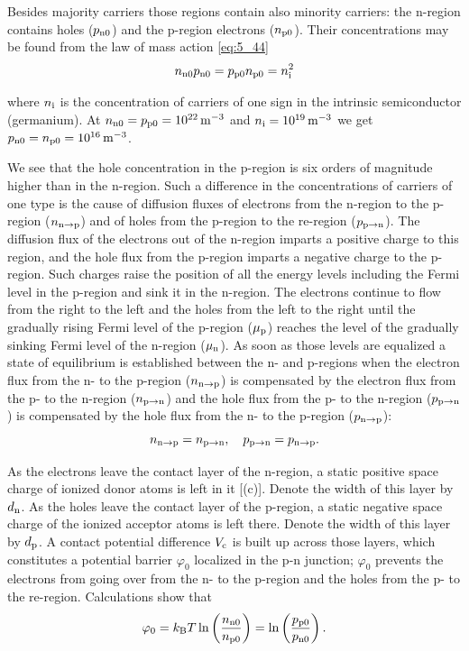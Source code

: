 Besides majority carriers those regions contain also minority carriers: the n-region contains holes ($p_{\text{n$0$}}$) and the p-region electrons ($n_{\text{p$0$}}$). Their concentrations may be found from the law of mass action \eqref{eq:5_44}
\begin{equation*}
	n_{\text{n$0$}} p_{\text{n$0$}} = p_{\text{p$0$}} n_{\text{p$0$}} = n_{\text{i}}^2
\end{equation*}

\noindent
where $n_{\text{i}}$ is the concentration of carriers of one sign in the intrinsic semiconductor (germanium). At $n_{\text{n$0$}}=p_{\text{p$0$}}=\SI{e22}{\per\metre\cubed}$ and $n_{\text{i}}=\SI{e19}{\per\metre\cubed}$ we get $p_{\text{n$0$}}=n_{\text{p$0$}}=\SI{e16}{\per\metre\cubed}$.

We see that the hole concentration in the p-region is six orders of magnitude higher than in the n-region. Such a difference in the concentrations of carriers of one type is the cause of diffusion fluxes of electrons from the n-region to the p-region ($n_{\text{n$\to$p}}$) and of holes from the p-region to the re-region ($p_{\text{p$\to$n}}$). The diffusion flux of the electrons out of the n-region imparts a positive charge to this region, and the hole flux from the p-region imparts a negative charge to the p-region. Such charges raise the position of all the energy levels including the Fermi level in the p-region and sink it in the n-region. The electrons continue to flow from the right to the left and the holes from the left to the right until the gradually rising Fermi level of the p-region ($\mu_{\text{p}}$) reaches the level of the gradually sinking Fermi level of the n-region ($\mu_{\text{n}}$).
As soon as those levels are equalized a state of equilibrium is established between the n- and p-regions when the electron flux from the n- to the p-region ($n_{\text{n$\to$p}}$) is compensated by the electron flux from the p- to the n-region ($n_{\text{p$\to$n}}$) and the hole flux from the p- to the n-region ($p_{\text{p$\to$n}}$) is compensated by the hole flux from the n- to the p-region ($p_{\text{n$\to$p}}$):
\begin{equation}\label{eq:8_17}
	n_{\text{n$\to$p}} = n_{\text{p$\to$n}},\quad p_{\text{p$\to$n}} = p_{\text{n$\to$p}}.
\end{equation}

As the electrons leave the contact layer of the n-region, a static positive space charge of ionized donor atoms is left in it [(c)]. Denote the width of this layer by $d_{\text{n}}$. As the holes leave the contact layer of the p-region, a static negative space charge of the ionized acceptor atoms is left there. Denote the width of this layer by $d_{\text{p}}$. A contact potential difference $V_{\text{c}}$ is built up across those layers, which constitutes a potential barrier $\varphi_0$ localized in the p-n junction; $\varphi_0$ prevents the electrons from going over from the n- to the p-region and the holes from the p- to the re-region. Calculations show that
\begin{equation}\label{eq:8_18}
	\varphi_0 = k_{\text{B}} T \ln\left(\frac{n_{\text{n$0$}}}{n_{\text{p$0$}}}\right) = \ln\left(\frac{p_{\text{p$0$}}}{p_{\text{n$0$}}}\right).
\end{equation}

